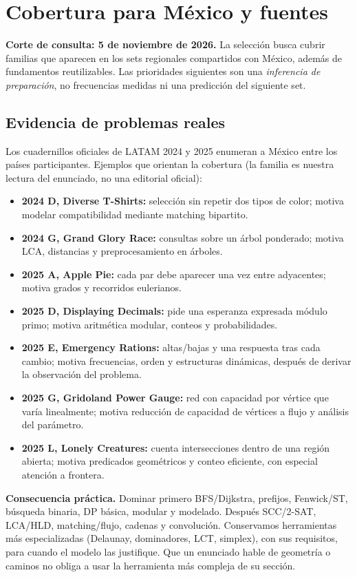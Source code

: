 \section{Cobertura para México y fuentes}
\label{sec:sources}
\textbf{Corte de consulta: 5 de noviembre de 2026.} La selección busca cubrir familias que aparecen en los sets regionales compartidos con México, además de fundamentos reutilizables. Las prioridades siguientes son una \emph{inferencia de preparación}, no frecuencias medidas ni una predicción del siguiente set.

\subsection{Evidencia de problemas reales}
Los cuadernillos oficiales de LATAM 2024 y 2025 enumeran a México entre los países participantes. Ejemplos que orientan la cobertura (la familia es nuestra lectura del enunciado, no una editorial oficial):
\begin{itemize}
\item \textbf{2024 D, Diverse T-Shirts:} selección sin repetir dos tipos de color; motiva modelar compatibilidad mediante matching bipartito.
\item \textbf{2024 G, Grand Glory Race:} consultas sobre un árbol ponderado; motiva LCA, distancias y preprocesamiento en árboles.
\item \textbf{2025 A, Apple Pie:} cada par debe aparecer una vez entre adyacentes; motiva grados y recorridos eulerianos.
\item \textbf{2025 D, Displaying Decimals:} pide una esperanza expresada módulo primo; motiva aritmética modular, conteos y probabilidades.
\item \textbf{2025 E, Emergency Rations:} altas/bajas y una respuesta tras cada cambio; motiva frecuencias, orden y estructuras dinámicas, después de derivar la observación del problema.
\item \textbf{2025 G, Gridoland Power Gauge:} red con capacidad por vértice que varía linealmente; motiva reducción de capacidad de vértices a flujo y análisis del parámetro.
\item \textbf{2025 L, Lonely Creatures:} cuenta intersecciones dentro de una región abierta; motiva predicados geométricos y conteo eficiente, con especial atención a frontera.
\end{itemize}
\textbf{Consecuencia práctica.} Dominar primero BFS/Dijkstra, prefijos, Fenwick/ST, búsqueda binaria, DP básica, modular y modelado. Después SCC/2-SAT, LCA/HLD, matching/flujo, cadenas y convolución. Conservamos herramientas más especializadas (Delaunay, dominadores, LCT, simplex), con sus requisitos, para cuando el modelo las justifique. Que un enunciado hable de geometría o caminos no obliga a usar la herramienta más compleja de su sección.

